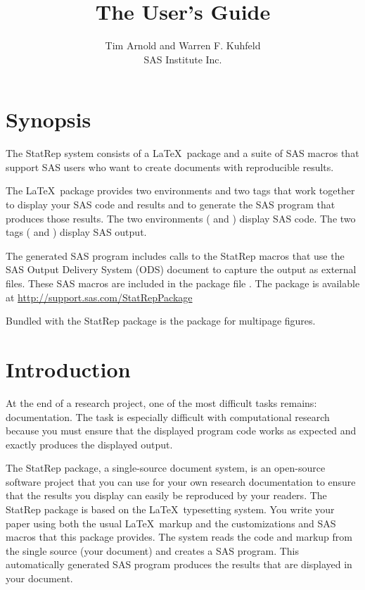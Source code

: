 \documentclass[article,oneside]{memoir}
\title{The \StatRep User's Guide}
\author{Tim Arnold and Warren F. Kuhfeld\\SAS Institute Inc.}
\newcommand*{\StatRep}{\textsf{StatRep}\xspace}
\begin{document}
\maketitle
\tableofcontents*%
\chapter{Synopsis}
The \StatRep system consists of a \LaTeX\ package and a suite of SAS macros that
support SAS users who want to create documents with reproducible results.

The \LaTeX\ package provides two environments and
two tags that work together to display your SAS code and results and to
generate the SAS program that produces those results. The two environments
( and ) display SAS code. 
The two tags ( and ) display SAS output.

The generated SAS program includes calls to the \StatRep macros that use the SAS
Output Delivery System (ODS) document to capture the output as external files.
These SAS macros are included in the package file .
The package is available at \url{http://support.sas.com/StatRepPackage}

Bundled with the StatRep package is the  package for
multipage figures.
\chapter{Introduction}

At the end of a research project, one of the most difficult tasks remains: documentation. 
The task is especially difficult with computational research because you
must ensure that the displayed program code works as expected and exactly produces the 
displayed output. 

The \StatRep package, a single-source document system,
is an open-source software project that you can use for your own research documentation
to ensure that the results you display can easily be reproduced by your readers. 
The \StatRep package is based on the \LaTeX\ typesetting system. You write your paper using
both the usual \LaTeX\ markup and the customizations and SAS macros that this package provides. 
The system reads the code and markup from the single source (your document) and creates a
SAS program. This automatically generated SAS program produces the results that are displayed 
in your document.
\end{document}
